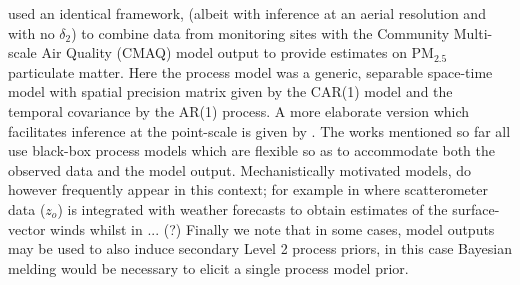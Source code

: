 \documentclass[10pt,a4paper]{article}
\begin{document}
\noindent \cite{McMillan_2010} used an identical framework, (albeit with inference at an aerial resolution and with no $\delta_2$) to combine data from monitoring sites with the Community Multi-scale Air Quality (CMAQ) model output to provide estimates on PM$_{2.5}$ particulate matter. Here the process model was a generic, separable space-time model with spatial precision matrix given by the CAR(1) model \citep{Rue_2005} and the temporal covariance by the AR(1) process. A more elaborate version which facilitates inference at the point-scale is given by \cite{Sahu_2010}.  The works mentioned so far all use black-box process models which are flexible so as to accommodate both the observed data and the model output. Mechanistically motivated models, do however frequently appear in this context; for example in \citep{Milliff_2011} where scatterometer data ($z_o$) is integrated with weather forecasts to obtain estimates of the surface-vector winds whilst in ... (?) Finally we note that in some cases, model outputs may be used to also induce secondary Level 2 process priors, in this case Bayesian melding \citep{Poole_2000} would be necessary to elicit a single process model prior. 
\end{document}
